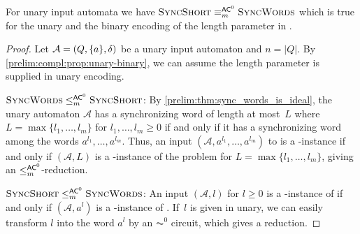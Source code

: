 \begin{proposition} \label{compl:prop:reductions_unary-SWS-SW}
	For unary input automata we have $\text{\sc Sync\-Short} \equiv_m^{\textup{\textsf{AC}}^0} \text{\sc Sync\-Words}$
	which is true for the unary and the binary encoding of the length parameter
	in \DFASWS.
\end{proposition}
\begin{proof}
	Let $\mathcal A = (Q, \{a\}, \delta)$ be a unary input automaton
	and $n = |Q|$.
	By \cref{prelim:compl:prop:unary-binary}, we can assume
	the length parameter is supplied in unary encoding.
	
	\medskip 
	\noindent\underline{$\text{\sc Sync\-Words} \le_m^{\textup{\textsf{AC}}^0} \text{\sc Sync\-Short}$}: By \cref{prelim:thm:sync_words_is_ideal}, 
	the unary automaton $\mathcal A$ 
	has a synchronizing word of length at most~$L$ where $L = \max\{l_1, \ldots, l_m\}$
	for $l_1, \ldots, l_m \ge 0$
	if and only if it has a synchronizing word 
	among the words $a^{l_1}, \ldots, a^{l_m}$.
	Thus, an input $(\mathcal A, a^{l_1}, \ldots, a^{l_m})$ to \DFASW
	is a \rYES-instance
	if and only if  $(\mathcal A, L)$
	is a \rYES-instance of the problem \DFASWS for $L = \max\{l_1, \ldots, l_m\}$, giving an $\le_m^{\textup{\textsf{AC}}^0}$-reduction.
				
	\medskip 
	\noindent\underline{$\text{\sc Sync\-Short} \le_m^{\textup{\textsf{AC}}^0} \text{\sc Sync\-Words}$}:
	An input $(\mathcal A, l)$ for $l \ge 0$
	is a \rYES-instance of \DFASWS if and only if 
	$(\mathcal A, a^l)$ is a \rYES-instance 
	of \DFASW. If~$l$ is given in unary,
	we can easily transform $l$ into the word $a^l$
	by an $\AC^0$ circuit, which gives a reduction.
\end{proof}